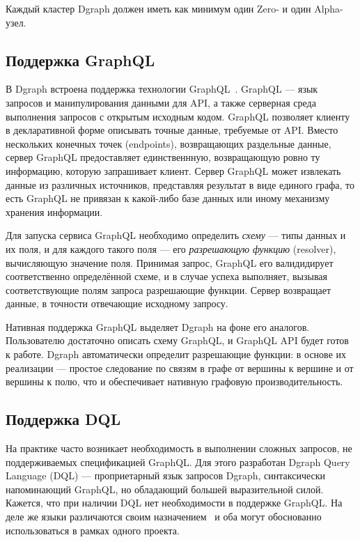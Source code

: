 Каждый кластер Dgraph должен иметь как минимум один Zero- и один Alpha-узел.

\subsection{Поддержка GraphQL}

В Dgraph встроена поддержка технологии GraphQL~\cite{graphql}. GraphQL --- язык запросов и манипулирования данными для
API, а также серверная среда выполнения запросов с открытым исходным кодом. GraphQL позволяет клиенту в декларативной
форме описывать точные данные, требуемые от API. Вместо нескольких конечных точек (endpoints), возвращающих раздельные
данные, сервер GraphQL предоставляет единственнную, возвращающую ровно ту информацию, которую запрашивает клиент. Сервер
GraphQL может извлекать данные из различных источников, представляя результат в виде единого графа, то есть GraphQL не
привязан к какой-либо базе данных или иному механизму хранения информации.

Для запуска сервиса GraphQL необходимо определить \textit{схему} --- типы данных и их поля, и для каждого такого поля
--- его \textit{разрешающую функцию} (resolver), вычисляющую значение поля. Принимая запрос, GraphQL его валидидирует
соответственно определённой схеме, и в случае успеха выполняет, вызывая соответствующие полям запроса разрешающие
функции. Сервер возвращает данные, в точности отвечающие исходному запросу.

Нативная поддержка GraphQL выделяет Dgraph на фоне его аналогов. Пользователю достаточно описать схему GraphQL, и
GraphQL API будет готов к работе. Dgraph автоматически определит разрешающие функции: в основе их реализации --- простое
следование по связям в графе от вершины к вершине и от вершины к полю, что и обеспечивает нативную графовую
производительность.

\subsection{Поддержка DQL}

На практике часто возникает необходимость в выполнении сложных запросов, не поддерживаемых спецификацией GraphQL. Для
этого разработан Dgraph Query Language (DQL) --- проприетарный язык запросов Dgraph, синтаксически напоминающий GraphQL,
но обладающий большей выразительной силой. Кажется, что при наличии DQL нет необходимости в поддержке GraphQL. На деле
же языки различаются своим назначением~\cite{graphqlVsDql} и оба могут обоснованно использоваться в рамках одного
проекта.

